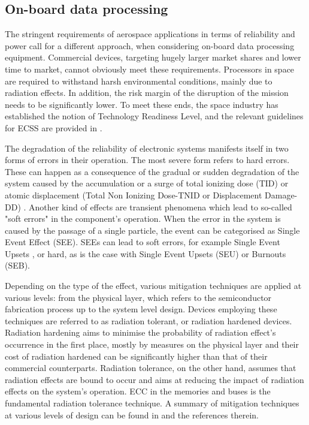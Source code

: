 \subsection{On-board data processing}\label{subsec:Onboard}
The stringent requirements of aerospace applications in terms of reliability and power call for a different approach, when considering on-board data processing equipment. Commercial devices, targeting hugely larger market shares and lower time to market,  cannot obviously meet these requirements. Processors in space are required to withstand harsh environmental conditions, mainly due to radiation effects. In addition, the risk margin of the disruption of the mission needs to be significantly lower. To meet these ends, the space industry has established the notion of Technology Readiness Level, and the relevant guidelines for ECSS are provided in \cite{ECSS-E-HB-11A}.\par
The degradation of the reliability of electronic systems manifests itself in two forms of errors in their operation. The most severe form refers to hard errors. These can happen as a consequence of the gradual or sudden degradation of the system caused by the accumulation or a surge of total ionizing dose (TID) or atomic displacement (Total Non Ionizing Dose-TNID or Displacement Damage-DD) \cite{Ecoffet2013}. Another kind of effects are transient phenomena which lead to so-called "soft errors" in the component's operation. When the error in the system is caused by the passage of a single particle, the event can be categorised as Single Event Effect (SEE). SEEs can lead to soft errors, for example Single Event Upsets \cite{George2019}, or hard, as is the case with Single Event Upsets (SEU) or Burnouts (SEB).\par
Depending on the type of the effect, various mitigation techniques are applied at various levels: from the physical layer, which refers to the semiconductor fabrication process up to the system level design. Devices employing these techniques are referred to as radiation tolerant, or radiation hardened devices. Radiation hardening aims to minimise the probability of radiation effect's occurrence in the first place, mostly by measures on the physical layer and their cost of radiation hardened can be significantly higher than that of their commercial counterparts. Radiation tolerance, on the other hand, assumes that radiation effects are bound to occur and aims at reducing the impact of radiation effects on the system's operation. ECC in the memories and buses is the fundamental radiation tolerance technique. A summary of mitigation techniques at various levels of design can be found in \cite{HUANG2019105} and the references therein.\par
